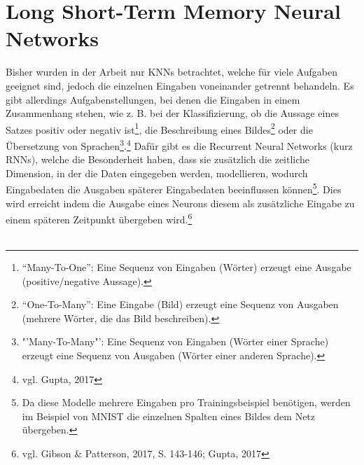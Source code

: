 \documentclass[a4paper,12pt,ngerman,oneside]{scrreprt}	%
\newcommand{\practitioner}[1]{vgl. Gibson \& Patterson, 2017, S. {#1}}
\begin{document}
	\chapter{Long Short-Term Memory Neural Networks}\label{LSTM Kapitel}
	Bisher wurden in der Arbeit nur KNNs betrachtet, welche für viele Aufgaben geeignet sind, jedoch die einzelnen Eingaben voneinander getrennt behandeln. Es gibt allerdings Aufgabenstellungen, bei denen die Eingaben in einem Zusammenhang stehen, wie z. B. bei der Klassifizierung, ob die Aussage eines Satzes positiv oder negativ ist\footnote{"`Many-To-One"': Eine Sequenz von Eingaben (Wörter) erzeugt eine Ausgabe (positive/negative Aussage).}, die Beschreibung eines Bildes\footnote{"`One-To-Many"': Eine Eingabe (Bild) erzeugt eine Sequenz von Ausgaben (mehrere Wörter, die das Bild beschreiben).} oder die Übersetzung von Sprachen\footnote{"'Many-To-Many"': Eine Sequenz von Eingaben (Wörter einer Sprache) erzeugt eine Sequenz von Ausgaben (Wörter einer anderen Sprache).}.\footnote{vgl. Gupta, 2017} Dafür gibt es die Recurrent Neural Networks (kurz RNNs), welche die Besonderheit haben, dass sie zusätzlich die zeitliche Dimension, in der die Daten eingegeben werden, modellieren, wodurch Eingabedaten die Ausgaben späterer Eingabedaten beeinflussen können\footnote{Da diese Modelle mehrere Eingaben pro Trainingsbeispiel benötigen, werden im Beispiel von MNIST die einzelnen Spalten eines Bildes dem Netz übergeben.}. Dies wird erreicht indem die Ausgabe eines Neurons diesem als zusätzliche Eingabe zu einem späteren Zeitpunkt übergeben wird.\footnote{\practitioner{143-146; Gupta, 2017}}
	\\\
\end{document}
